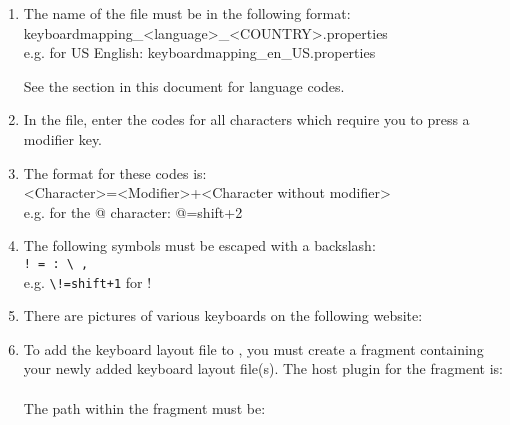 \begin{enumerate}
\item The name of the file must be in the following format:\\
keyboardmapping\_<language>\_<COUNTRY>.properties\\
e.g. for US English: keyboardmapping\_en\_US.properties

See the section in this document  for language codes.
\item In the file, enter the codes for all characters which require you to press a modifier key. 
\item The format for these codes is:\\
<Character>=<Modifier>+<Character without modifier>\\
e.g. for the @ character: @=shift+2
\item The following symbols must be escaped with a backslash:\\
\verb+! = : \ ,+\\
e.g. \verb?\!=shift+1? for !
\item There are pictures of various keyboards on the following website:\\
\item To add the keyboard layout file to \app{}, you must create a fragment containing your newly added keyboard layout file(s). The host plugin for the fragment is:\\
\\
The path within the fragment must be:\\
\\


\end{enumerate}

